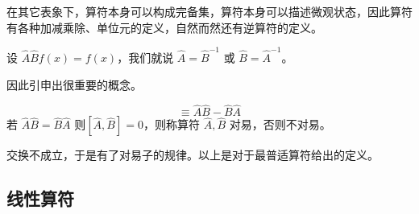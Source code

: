 % 



在其它表象下，算符本身可以构成完备集，算符本身可以描述微观状态，因此算符有各种加减乘除、单位元的定义，自然而然还有逆算符的定义。

\begin{theorem}[逆算符]
    设 $\hat A\hat B f(x) = f(x)$，我们就说 $\hat A = \hat B^{-1}$ 或 $\hat B = \hat A^{-1}$。
\end{theorem}

因此引申出很重要的概念。

\begin{theorem}[对易]
    \begin{equation}
        [\hat A, \hat B] \equiv \hat A \hat B -\hat B \hat A
    \end{equation}
    若 $\hat A \hat B = \hat B \hat A$ 则$[\hat A,\hat B] = 0$，则称算符 $\hat A, \hat B$ 对易，否则不对易。
\end{theorem}


交换不成立，于是有了对易子的规律。以上是对于最普适算符给出的定义。

\subsection{线性算符}

